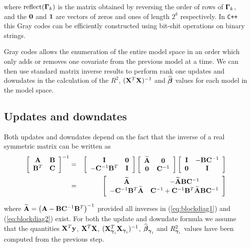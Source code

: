 \documentclass{article}[12pt]
\begin{document}
\noindent where $\mbox{reflect}({\boldsymbol \Gamma}_k)$ is the matrix obtained by reversing the order of rows of ${\boldsymbol \Gamma}_k$, and the ${\bf 0}$ and ${\bf 1}$ are vectors of zeros and ones
of length $2^k$ respectively. In {\tt C++} this Gray codes can be efficiently constructed
using bit-shit operations on binary strings.

Gray codes allows the enumeration of the entire model space in an order which only adds
or removes one covariate from the previous model at a time. We can then use standard matrix
inverse results to perform rank
one updates and downdates in the calculation of the $R^2$, $({\bf X}^T{\bf X})^{-1}$ and
$\widehat{{\boldsymbol \beta}}$ values for each model in the
model space.

\subsection{Updates and downdates} 

Both updates and downdates depend on the fact that
the inverse of a real symmetric matrix can be written as
\begin{eqnarray}
\displaystyle \left[ \begin{array}{cc}
{\bf A}   & {\bf B} \\
{\bf B}^T & {\bf C}
\end{array} \right]^{-1}
&  = &
\displaystyle \left[ \begin{array}{cc}
{\bf I} & {\bf 0} \\
-{\bf C}^{-1}{\bf B}^T &  {\bf I}
\end{array} \right]
\left[ \begin{array}{cc}
\widetilde{{\bf A}} & {\bf 0} \\
{\bf 0} & {\bf C}^{-1}
\end{array} \right]
\left[ \begin{array}{cc}
{\bf I}    & -{\bf B}{\bf C}^{-1}\\
{\bf 0} & {\bf I}
\end{array} \right] \label{eq:blockdiag1}\\
&  = &
\displaystyle\left[
\begin{array}{cc}
\widetilde{{\bf A}}
& - \widetilde{{\bf A}}{\bf B}{\bf C}^{-1} \\
-{\bf C}^{-1}{\bf B}^T\widetilde{{\bf A}}
& {\bf C}^{-1} + {\bf C}^{-1}{\bf B}^T\widetilde{{\bf A}}{\bf B}{\bf C}^{-1}
\end{array}\right]\label{eq:blockdiag2}
\end{eqnarray}

\noindent where $\widetilde{{\bf A}} = \left({\bf A}-{\bf B}{\bf C}^{-1}{\bf B}^T\right)^{-1}$
provided all inverses in (\ref{eq:blockdiag1}) and
(\ref{eq:blockdiag2}) exist. 
For both the update and downdate formula we assume that the quantities
${\bf X}^T{\bf y}$, ${\bf X}^T{\bf X}$, $({\bf X}_{{\boldsymbol \gamma}_i}^T{\bf X}_{{\boldsymbol \gamma}_i})^{-1}$, 
$\widehat{{\boldsymbol \beta}}_{{\boldsymbol \gamma}_i}$ and $R_{{\boldsymbol \gamma}_i}^2$ values have been computed from the previous step.
\end{document}
